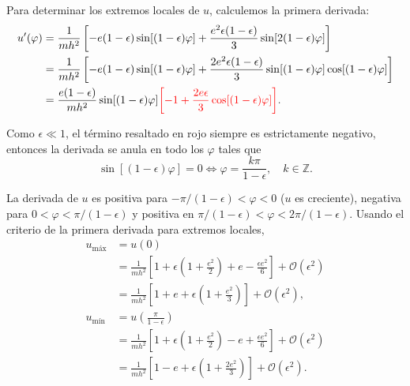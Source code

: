 \documentclass[letterpaper,11pt]{article}
\begin{document}
Para determinar los extremos locales de $u$, calculemos la primera derivada:
\begin{align}
u'(\varphi) &= \frac{1}{mh^2} \left[ - e(1-\epsilon)\sin[(1-\epsilon)\varphi] +  \frac{e^2\epsilon(1-\epsilon)}{3} \sin[2(1 - \epsilon)\varphi] \right] \nonumber\\
&=  \frac{1}{mh^2} \left[ - e(1-\epsilon)\sin[(1-\epsilon)\varphi] +  \frac{2 e^2\epsilon(1-\epsilon)}{3} \sin[(1 - \epsilon)\varphi] \cos[(1 - \epsilon)\varphi] \right] \nonumber \\
&= \frac{e(1-\epsilon)}{mh^2} \sin[(1-\epsilon)\varphi] \textcolor{red}{\left[-1 + \frac{2e\epsilon}{3} \cos[(1 - \epsilon)\varphi] \right]}.
\end{align}

Como $\epsilon \ll 1$, el término resaltado en rojo siempre es estrictamente negativo, entonces la derivada se anula en todo los $\varphi$ tales que
\begin{equation}
 \sin[(1-\epsilon)\varphi] = 0 \Leftrightarrow \varphi = \frac{k\pi}{1- \epsilon}, \quad k  \in \mathbb{Z}.
\end{equation}

La derivada de $u$ es positiva para $- \pi/(1 - \epsilon)<\varphi < 0$ ($u$ es creciente), negativa para $0 <\varphi < \pi/(1 - \epsilon)$ y positiva en $\pi/(1 - \epsilon) < \varphi < 2\pi/(1-\epsilon)$. Usando el criterio de la primera derivada para extremos locales,
\begin{align}
u_{\text{máx}} &= u(0) \nonumber\\
&= \frac{1}{mh^2} \left[ 1 + \epsilon \left( 1 + \frac{e^2}{2}\right) + e - \frac{\epsilon e^2}{6} \right] + \mathcal{O}(\epsilon^2) \nonumber \\
&= \frac{1}{mh^2} \left[ 1 + e + \epsilon \left( 1 + \frac{e^2}{3}\right) \right] + \mathcal{O}(\epsilon^2), \label{eq:u-max} \\
u_{\text{mín}} &= u\left(\frac{\pi}{1 - \epsilon}\right) \nonumber\\
&= \frac{1}{mh^2} \left[ 1 + \epsilon \left( 1 + \frac{e^2}{2}\right) - e + \frac{\epsilon e^2}{6} \right] + \mathcal{O}(\epsilon^2) \nonumber \\
&= \frac{1}{mh^2} \left[ 1 - e + \epsilon \left( 1 + \frac{2e^2}{3}\right) \right] + \mathcal{O}(\epsilon^2). \label{eq:u-min}
\end{align}
\end{document}

